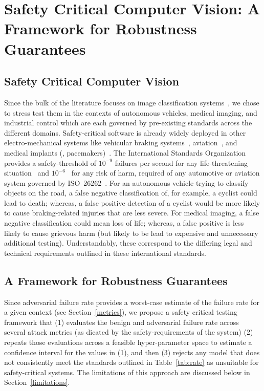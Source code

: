 \section{Safety Critical Computer Vision: A Framework for Robustness Guarantees}
\label{safety-critical}

\subsection{Safety Critical Computer Vision}
Since the bulk of the literature focuses on image classification systems~\cite{dohmatob_generalized_2019,biggio_evasion_2013-1,bect_bayesian_2017,chakraborty_adversarial_2018,carlini_towards_2017,croce_reliable_2020}, we chose to stress test them in the contexts of autonomous vehicles, medical imaging, and industrial control which are each governed by pre-existing standards across the different domains.
Safety-critical software is already widely deployed in other electro-mechanical systems like vehicular braking systems~\cite{braking}, aviation~\cite{aviation}, and medical implants (\eg, pacemakers)~\cite{tuan2010modeling}.
The International Standards Organization provides a safety-threshold of $10^{-9}$ failures per second for any life-threatening situation~\cite{iso26262} and $10^{-6}$~\cite{iso26262} for any risk of harm, required of any automotive or aviation system governed by ISO~26262~\cite{iso26262}.
For an autonomous vehicle trying to classify objects on the road, a false negative classification of, for example, a cyclist could lead to death; whereas, a false positive detection of a cyclist would be more likely to cause braking-related injuries that are less severe.
For medical imaging, a false negative classification could mean loss of life; whereas, a false positive is less likely to cause grievous harm (but likely to be lead to expensive and unnecessary additional testing).
Understandably, these correspond to the differing legal and technical requirements outlined in these international standards.



\subsection{A Framework for Robustness Guarantees}
\label{safety_critical}
Since adversarial failure rate provides a worst-case estimate of the failure rate for a given context (see Section~\ref{metrics}), we propose a safety critical testing framework that (1) evaluates the benign and adversarial failure rate across several attack metrics (as dicated by the safety-requirements of the system) (2) repeats those evaluations across a feasible hyper-parameter space to estimate a confidence interval for the values in (1), and then (3)  rejects any model that does not consistently meet the standards outlined in Table~\ref{tab:rate} as unsuitable for safety-critical systems.
The limitations of this approach are discussed below in Section~\ref{limitations}.

